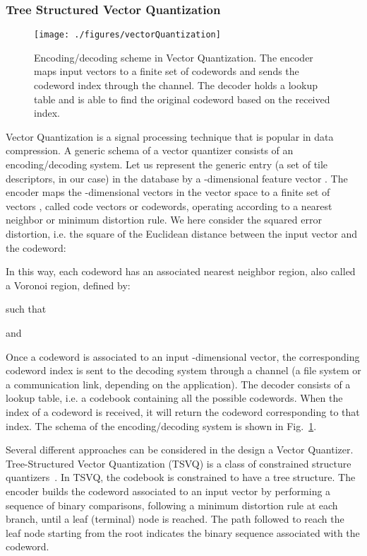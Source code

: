 \subsubsection{Tree Structured Vector Quantization}



\begin{figure}[t]
	\centering
\texttt{[image: ./figures/vectorQuantization]}
	\caption{Encoding/decoding scheme in Vector Quantization. The encoder maps input vectors to a finite set of codewords and sends the codeword index through the channel. The decoder holds a lookup table and is able to find the original codeword based on the received index.}
	\label{fig:vectorQuantization}
\end{figure}

Vector Quantization is a signal processing technique that is popular in data compression. 
A generic schema of a vector quantizer consists of an encoding/decoding system.
Let us represent the generic entry (a set of tile descriptors, in our case) in the database  by a -dimensional feature vector .
The encoder maps the -dimensional vectors in the vector space  to a finite set of vectors , called code vectors or codewords, operating according to a nearest neighbor or minimum distortion rule. 
We here consider the squared error distortion, i.e. the  square of the Euclidean distance between the  input vector and the codeword:

In this way, each codeword  has an associated nearest neighbor region, also called a Voronoi region, defined by:

such that

and

Once a codeword is associated to an input -dimensional vector, the corresponding codeword index is sent to the decoding system through a channel (a file system or a communication link, depending on the application).
The decoder consists of a lookup table, i.e. a codebook containing all the possible codewords. When the index of a codeword is received, it will return the codeword corresponding to that index.
The schema of the encoding/decoding system is shown in Fig.~\ref{fig:vectorQuantization}.



Several different approaches can be considered in the  design a Vector Quantizer.
Tree-Structured Vector Quantization (TSVQ) is a class of constrained structure quantizers~\cite{cosman1993tree}.
In TSVQ, the codebook is constrained to have a tree structure.
The encoder builds the codeword associated to an input vector by performing a sequence of binary comparisons, following a minimum distortion rule at each branch, until a leaf (terminal) node is reached.
The path followed to reach the leaf node starting from the root indicates the binary sequence associated with the codeword.





